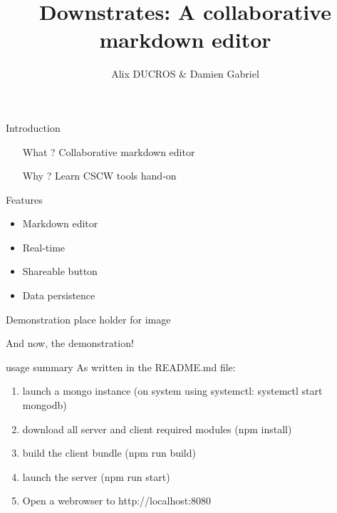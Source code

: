 \documentclass[11pt]{beamer}
\begin{document}
	\author[M2 HCI 2016-2017]{Alix DUCROS \& Damien Gabriel}
	\title{Downstrates: A collaborative markdown editor}
	
	\date{}
	
	\begin{frame}[plain]
		\maketitle
		
%		
	\end{frame}
	
	\begin{frame}{Introduction}
		\begin{itemize}
			\item[What ?] Collaborative markdown editor
			\item[Why ?] Learn CSCW tools hand-on
		\end{itemize}
	\end{frame}
	
	\begin{frame}{Features}
		\begin{itemize}
			\item Markdown editor
			\item Real-time
			\item Shareable button
			\item Data persistence
		\end{itemize}
	\end{frame}

\begin{frame}{Demonstration}
	place holder for image
	\begin{center}
		{\Huge And now, the demonstration!}
	\end{center}
\end{frame}

\begin{frame}{usage summary}
	As written in the README.md file:
	\begin{enumerate}
		\item launch a mongo instance
		(on system using systemctl: systemctl start mongodb)
		\item download all server and client required modules
		(npm install)
		\item build the client bundle
		(npm run build)
		\item launch the server
		(npm run start)
		\item Open a webrowser to http://localhost:8080
	\end{enumerate}
\end{frame}
\end{document}
